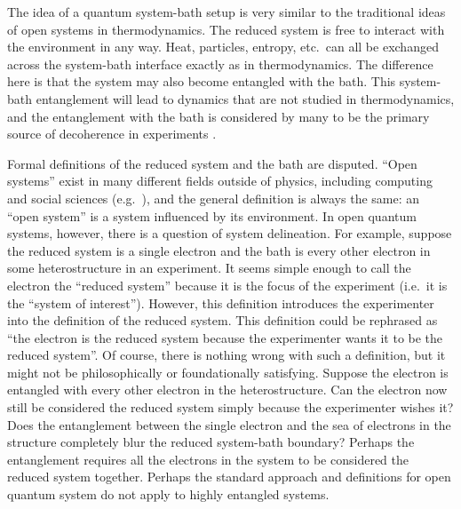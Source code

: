The idea of a quantum system-bath setup is very similar to the traditional ideas of open systems in thermodynamics.  The reduced system is free to interact with the environment in any way.  Heat, particles, entropy, etc.\ can all be exchanged across the system-bath interface exactly as in thermodynamics.  The difference here is that the system may also become entangled with the bath.  This system-bath entanglement will lead to dynamics that are not studied in thermodynamics, and the entanglement with the bath is considered by many to be the primary source of decoherence in experiments \cite{Zurek2003}.

Formal definitions of the reduced system and the bath are disputed.  ``Open systems'' exist in many different fields outside of physics, including computing and social sciences (e.g.\ \cite{Luhmann1995}), and the general definition is always the same: an ``open system'' is a system influenced by its environment.  In open quantum systems, however, there is a question of system delineation.  For example, suppose the reduced system is a single electron and the bath is every other electron in some heterostructure in an experiment.  It seems simple enough to call the electron the ``reduced system'' because it is the focus of the experiment (i.e.\ it is the ``system of interest'').  However, this definition introduces the experimenter into the definition of the reduced system.  This definition could be rephrased as ``the electron is the reduced system because the experimenter wants it to be the reduced system''.  Of course, there is nothing wrong with such a definition, but it might not be philosophically or foundationally satisfying.  Suppose the electron is entangled with every other electron in the heterostructure.  Can the electron now still be considered the reduced system simply because the experimenter wishes it?  Does the entanglement between the single electron and the sea of electrons in the structure completely blur the reduced system-bath boundary?  Perhaps the entanglement requires all the electrons in the system to be considered the reduced system together.  Perhaps the standard approach and definitions for open quantum system do not apply to highly entangled systems.

